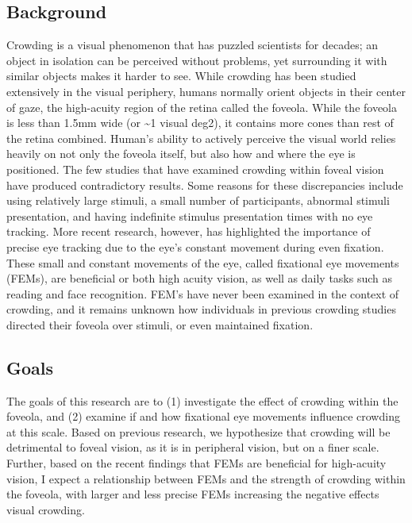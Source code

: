 \documentclass[
]{article}
\begin{document}
\hypertarget{background}{%
\subsection{Background}\label{background}}

Crowding is a visual phenomenon that has puzzled scientists for decades;
an object in isolation can be perceived without problems, yet
surrounding it with similar objects makes it harder to see. While
crowding has been studied extensively in the visual periphery, humans
normally orient objects in their center of gaze, the high-acuity region
of the retina called the foveola. While the foveola is less than 1.5mm
wide (or \textasciitilde{}1 visual deg2), it contains more cones than
rest of the retina combined. Human's ability to actively perceive the
visual world relies heavily on not only the foveola itself, but also how
and where the eye is positioned. The few studies that have examined
crowding within foveal vision have produced contradictory results. Some
reasons for these discrepancies include using relatively large stimuli,
a small number of participants, abnormal stimuli presentation, and
having indefinite stimulus presentation times with no eye tracking. More
recent research, however, has highlighted the importance of precise eye
tracking due to the eye's constant movement during even fixation. These
small and constant movements of the eye, called fixational eye movements
(FEMs), are beneficial or both high acuity vision, as well as daily
tasks such as reading and face recognition. FEM's have never been
examined in the context of crowding, and it remains unknown how
individuals in previous crowding studies directed their foveola over
stimuli, or even maintained fixation.

\hypertarget{goals}{%
\subsection{Goals}\label{goals}}

The goals of this research are to (1) investigate the effect of crowding
within the foveola, and (2) examine if and how fixational eye movements
influence crowding at this scale. Based on previous research, we
hypothesize that crowding will be detrimental to foveal vision, as it is
in peripheral vision, but on a finer scale. Further, based on the recent
findings that FEMs are beneficial for high-acuity vision, I expect a
relationship between FEMs and the strength of crowding within the
foveola, with larger and less precise FEMs increasing the negative
effects visual crowding.
\end{document}
